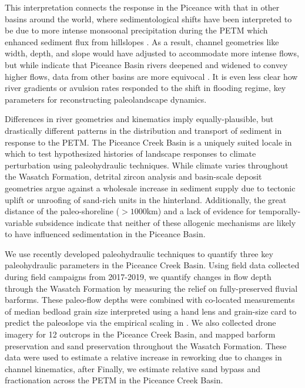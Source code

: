 \documentclass[draft]{compact_proposal}
\begin{document}
This interpretation connects the response in the Piceance with that in other basins around the world, where sedimentological shifts have been interpreted to be due to more intense monsoonal precipitation during the PETM which enhanced sediment flux from hillslopes .
As a result, channel geometries like width, depth, and slope would have adjusted to accommodate more intense flows, but while \textcite{foreman_fluvial_2012} indicate that Piceance Basin rivers deepened and widened to convey higher flows, data from other basins are more equivocal \parencite{chen_estimating_2018}. 
It is even less clear how river gradients or avulsion rates responded to the shift in flooding regime, key parameters for reconstructing paleolandscape dynamics.

Differences in river geometries and kinematics imply equally-plausible, but drastically different patterns in the distribution and transport of sediment in response to the PETM.
The Piceance Creek Basin is a uniquely suited locale in which to test hypothesized histories of landscape responses to climate perturbation using paleohydraulic techniques. 
While climate varies throughout the Wasatch Formation, detrital zircon analysis and basin-scale deposit geometries argue against a wholesale increase in sediment supply due to tectonic uplift or unroofing of sand-rich units in the hinterland.
Additionally, the great distance of the paleo-shoreline ($>1000$km) and a lack of evidence for temporally-variable subsidence indicate that neither of these allogenic mechanisms are likely to have influenced sedimentation in the Piceance Basin.

We use recently developed paleohydraulic techniques to quantify three key paleohydraulic parameters in the Piceance Creek Basin.
Using field data collected during field campaigns from 2017-2019, we quantify changes in flow depth through the Wasatch Formation by measuring the relief on fully-preserved fluvial barforms. 
These paleo-flow depths were combined with co-located measurements of median bedload grain size interpreted using a hand lens and grain-size card to predict the paleoslope via the empirical scaling in \textcite{trampush_empirical_2014}.
We also collected drone imagery for 12 outcrops in the Piceance Creek Basin, and mapped barform preservation and sand preservation throughout the Wasatch Formation. 
These data were used to estimate a relative increase in reworking due to changes in channel kinematics, after \textcite{chamberlin_using_2019} 
Finally, we estimate relative sand bypass and fractionation across the PETM in the Piceance Creek Basin.
\end{document}
